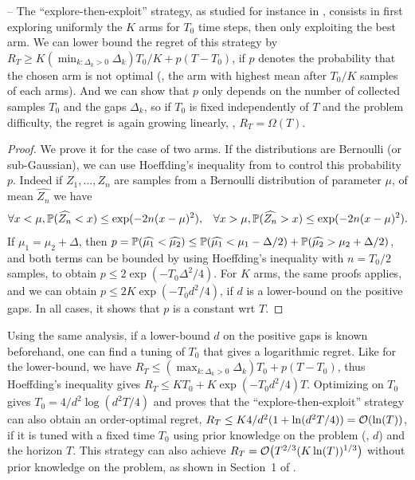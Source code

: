 -- The ``explore-then-exploit'' strategy, as studied for instance in \cite{GarivierETC2016}, consists in first exploring uniformly the $K$ arms for $T_0$ time steps, then only exploiting the best arm.
We can lower bound the regret of this strategy by
$R_T \geq K (\min_{k: \Delta_k > 0} \Delta_k) T_0/K + p (T - T_0)$,
if $p$ denotes the probability that the chosen arm is not optimal (\ie, the arm with highest mean after $T_0/K$ samples of each arms).
And we can show that $p$ only depends on the number of collected samples $T_0$ and the gaps $\Delta_k$,
so if $T_0$ is fixed independently of $T$ and the problem difficulty, the regret is again growing linearly, \ie, $R_T = \Omega(T)$.

\begin{proof}
    We prove it for the case of two arms.
    If the distributions are Bernoulli (or sub-Gaussian), we can use Hoeffding's inequality from \cite{hoeffding1963probability} to control this probability $p$.
    Indeed if $Z_1,\dots,Z_n$ are \iid{} samples from a Bernoulli distribution of parameter $\mu$, of mean $\widehat{Z_n}$ we have
    \begin{equation}
        \forall x < \mu, \mathbb{P}(\widehat{Z_n} < x) \leq \exp(-2 n (x-\mu)^2),
        \;\;\;
        \forall x > \mu, \mathbb{P}(\widehat{Z_n} > x) \leq \exp(-2 n (x-\mu)^2).
    \end{equation}
    If $\mu_1 = \mu_2 + \Delta$, then
    $p = \mathbb{P}(\widehat{\mu_1} < \widehat{\mu_2}) \leq \mathbb{P}(\widehat{\mu_1} < \mu_1 - \Delta/2) + \mathbb{P}(\widehat{\mu_2} > \mu_2 + \Delta/2)$, and both terms can be bounded by using Hoeffding's inequality with $n=T_0/2$ samples,
    to obtain $p \leq 2 \exp(-T_0 \Delta^2 / 4)$.
    For $K$ arms, the same proofs applies, and we can obtain
    $p \leq 2 K \exp(-T_0 d^2 / 4)$, if $d$ is a lower-bound on the positive gaps.
    In all cases, it shows that $p$ is a constant wrt $T$.
\end{proof}

Using the same analysis, if a lower-bound $d$ on the positive gaps is known beforehand, one can find a tuning of $T_0$ that gives a logarithmic regret.
%
Like for the lower-bound, we have $R_T \leq (\max_{k: \Delta_k > 0} \Delta_k) T_0 + p (T - T_0)$, thus Hoeffding's inequality gives $R_T \leq K T_0 + K \exp(-T_0 d^2/4) T$. Optimizing on $T_0$ gives $T_0 = 4/d^2 \log(d^2 T / 4)$
and proves that the ``explore-then-exploit'' strategy can also obtain an order-optimal regret, $R_T \leq K 4/d^2 (1 + \ln(d^2 T / 4)) = \mathop{}\mathopen{}\mathcal{O}\mathopen{}\left(\ln(T)\right)$, if it is tuned with a fixed time $T_0$ using prior knowledge on the problem (\ie, $d$) and the horizon $T$.
%
This strategy can also achieve $R_T = \mathop{}\mathopen{}\mathcal{O}\mathopen{}\left(T^{2/3} (K \ln(T))^{1/3}\right)$ without prior knowledge on the problem, as shown in Section~1 of \cite{Slivkins2019}.

